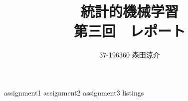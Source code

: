 \documentclass[dvipdfmx, fleqn, titlepage]{jsarticle}
\title{
	統計的機械学習 \\
	第三回　レポート
	}
\author{37-196360 \quad 森田涼介}
\begin{document}
\maketitle
{assignment1}
{assignment2}
{assignment3}
\newpage
{listings}
\end{document}
